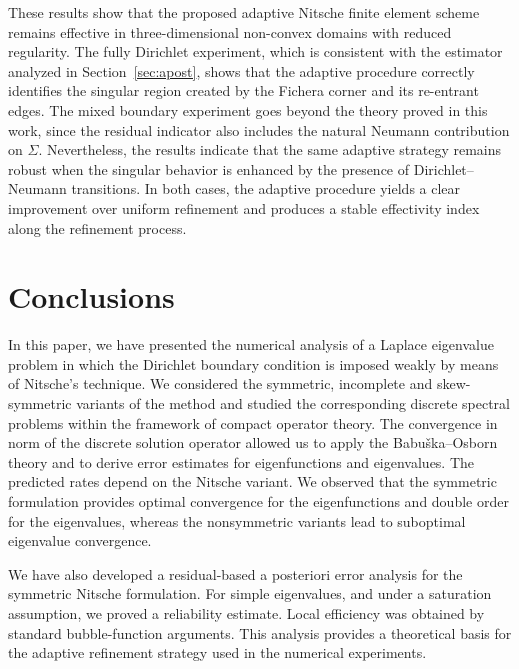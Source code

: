 \documentclass[onefignum,onetabnum,final]{siamart250211}
\numberwithin{equation}{section}
\newcommand\0{\boldsymbol{0}}
\begin{document}
These results show that the proposed adaptive Nitsche finite element scheme remains effective in three-dimensional non-convex domains with reduced regularity. The fully Dirichlet experiment, which is consistent with the estimator analyzed in Section~\ref{sec:apost}, shows that the adaptive procedure correctly identifies the singular region created by the Fichera corner and its re-entrant edges. The mixed boundary experiment goes beyond the theory proved in this work, since the residual indicator also includes the natural Neumann contribution on $\Sigma$. Nevertheless, the results indicate that the same adaptive strategy remains robust when the singular behavior is enhanced by the presence of Dirichlet--Neumann transitions. In both cases, the adaptive procedure yields a clear improvement over uniform refinement and produces a stable effectivity index along the refinement process.
	
	
	\section{Conclusions}\label{sec:conclusions}

In this paper, we have presented the numerical analysis of a Laplace eigenvalue problem in which the Dirichlet boundary condition is imposed weakly by means of Nitsche's technique. We considered the symmetric, incomplete and skew-symmetric variants of the method and studied the corresponding discrete spectral problems within the framework of compact operator theory. The convergence in norm of the discrete solution operator allowed us to apply the Babu\v{s}ka--Osborn theory and to derive error estimates for eigenfunctions and eigenvalues. The predicted rates depend on the Nitsche variant. We observed that the symmetric formulation provides optimal convergence for the eigenfunctions and double order for the eigenvalues, whereas the nonsymmetric variants lead to suboptimal eigenvalue convergence.

We have also developed a residual-based a posteriori error analysis for the symmetric Nitsche formulation. For simple eigenvalues, and under a saturation assumption, we proved a reliability estimate. Local efficiency was obtained by standard bubble-function arguments. This analysis provides a theoretical basis for the adaptive refinement strategy used in the numerical experiments.
\end{document}
